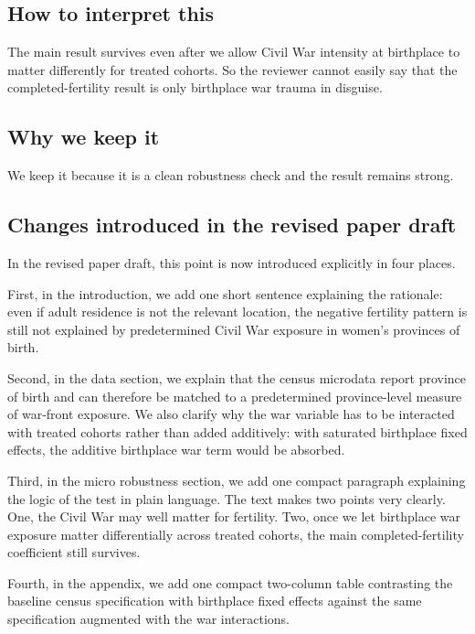 \documentclass[11pt]{article}
\begin{document}
\subsection*{How to interpret this}

The main result survives even after we allow Civil War intensity at birthplace to matter differently for treated cohorts. So the reviewer cannot easily say that the completed-fertility result is only birthplace war trauma in disguise.

\subsection*{Why we keep it}

We keep it because it is a clean robustness check and the result remains strong.

\subsection*{Changes introduced in the revised paper draft}

In the revised paper draft, this point is now introduced explicitly in four places.

First, in the introduction, we add one short sentence explaining the rationale: even if adult residence is not the relevant location, the negative fertility pattern is still not explained by predetermined Civil War exposure in women's provinces of birth.

Second, in the data section, we explain that the census microdata report province of birth and can therefore be matched to a predetermined province-level measure of war-front exposure. We also clarify why the war variable has to be interacted with treated cohorts rather than added additively: with saturated birthplace fixed effects, the additive birthplace war term would be absorbed.

Third, in the micro robustness section, we add one compact paragraph explaining the logic of the test in plain language. The text makes two points very clearly. One, the Civil War may well matter for fertility. Two, once we let birthplace war exposure matter differentially across treated cohorts, the main completed-fertility coefficient still survives.

Fourth, in the appendix, we add one compact two-column table contrasting the baseline census specification with birthplace fixed effects against the same specification augmented with the war interactions.
\end{document}
